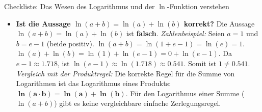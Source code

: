 \begin{loesungsumgebung}{Checkliste: Das Wesen des Logarithmus und der $\ln$-Funktion verstehen}
\begin{enumerate}[label=(\alph*)]
\begin{itemize}
        \item \textbf{Ist die Aussage $\ln(a+b) = \ln(a) + \ln(b)$ korrekt?}
        Die Aussage $\ln(a+b) = \ln(a) + \ln(b)$ ist \textbf{falsch}.
        \textit{Zahlenbeispiel:} Seien $a=1$ und $b=e-1$ (beide positiv).
        $\ln(a+b) = \ln(1 + e-1) = \ln(e) = 1$.
        $\ln(a) + \ln(b) = \ln(1) + \ln(e-1) = 0 + \ln(e-1)$.
        Da $e-1 \approx 1.718$, ist $\ln(e-1) \approx \ln(1.718) \approx 0.541$.
        Somit ist $1 \neq 0.541$.
        \textit{Vergleich mit der Produktregel:} Die korrekte Regel für die Summe von Logarithmen ist das Logarithmus eines Produkts: $\mathbf{\ln(a \cdot b) = \ln(a) + \ln(b)}$. Für den Logarithmus einer Summe ($\ln(a+b)$) gibt es keine vergleichbare einfache Zerlegungsregel.
    \end{itemize}
\end{enumerate}

\end{loesungsumgebung}





